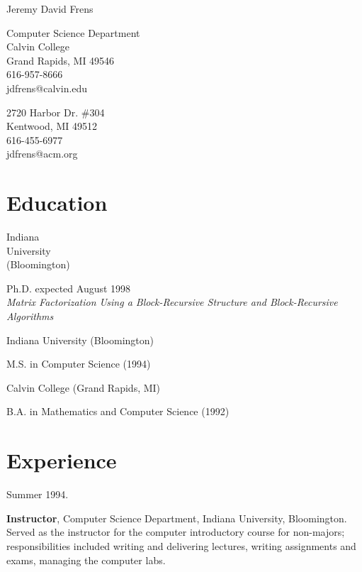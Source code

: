 \documentclass{article}
\begin{document}
\centerline{\Large\sc Jeremy David Frens}

\medskip

\hfill
\begin{minipage}[t]{2in}
Computer Science Department \\
Calvin College              \\
Grand Rapids, MI 49546      \\
616-957-8666                \\
jdfrens@calvin.edu          \\
\end{minipage}
\hfill
\begin{minipage}[t]{2in}
2720 Harbor Dr. \#304      \\
Kentwood, MI 49512         \\
616-455-6977               \\
jdfrens@acm.org             \\
\end{minipage}
\hfill

\section*{Education}

\parbox[t]{1in}{Indiana \\ University \\ (Bloomington)}
\hfill\begin{minipage}[t]{5.5in}
  Ph.D. expected August 1998 \\
  \textit{Matrix Factorization Using a Block-Recursive Structure and Block-Recursive Algorithms}
\end{minipage}

\smallskip
Indiana University (Bloomington) 

\hfill\begin{minipage}[t]{6.5in}
  M.S. in Computer Science (1994)
\end{minipage}

\smallskip
Calvin College (Grand Rapids, MI)

\hfill\begin{minipage}[t]{6.5in}
  B.A. in Mathematics and Computer Science (1992)
\end{minipage}

\section*{Experience}

\parbox[t]{1in}{Summer 1994.}
\hfill\parbox[t]{5.5in} {
  \textbf{Instructor}, Computer Science Department, Indiana University, Bloomington. \\
  Served as the instructor for the computer introductory course
  for non-majors; responsibilities included writing and delivering
  lectures, writing assignments and exams, managing the computer
  labs.}
\end{document}
